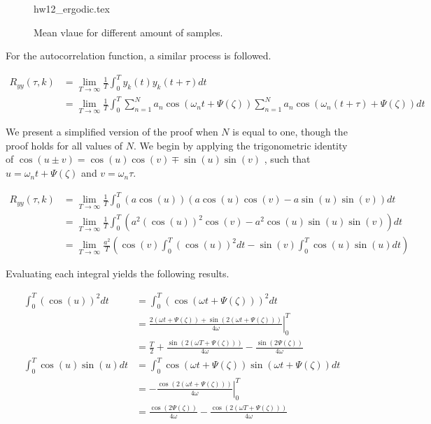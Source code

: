 \documentclass[a4paper,12pt]{article}
\begin{document}
\begin{enumerate}
\begin{figure}[htb!]
\centering
{hw12_ergodic.tex}
\caption{Mean vlaue for different amount of samples.}
\label{fig: ergodic}
\end{figure}

 For the autocorrelation function, a similar process is followed.

 \begin{align*}
  R_{yy} (\tau, k) & = \lim _{T \rightarrow \infty} \frac{1}{T} \int_0^T y_k (t) y_k (t + \tau) dt\\
  &= \lim _{T \rightarrow \infty} \frac{1}{T} \int_0^T \sum_{n=1}^N a_n \cos(\omega_n t + \Psi (\zeta))
  \sum_{n=1}^N a_n \cos(\omega_n (t+ \tau) + \Psi (\zeta))
  dt
 \end{align*}

We present a simplified version of the proof when $N$ is equal to one, though the proof holds for all values of $N$.
We begin by applying the trigonometric identity of $\cos(u\pm v) = \cos(u)\cos(v) \mp \sin(u) \sin(v)$ , such that $u = \omega_n t + \Psi(\zeta)$ and $v = \omega_n \tau$.

 \begin{align*}
  R_{yy} (\tau, k) &= \lim _{T \rightarrow \infty} \frac{1}{T} \int_0^T  (a \cos(u))(a\cos(u)\cos(v) - a\sin(u)\sin(v)) dt\\
  &= \lim _{T \rightarrow \infty} \frac{1}{T} \int_0^T  (a^2 (\cos (u))^2 \cos(v) - a^2 \cos(u)\sin(u)\sin(v)) dt\\
  &= \lim _{T \rightarrow \infty} \frac{a^2}{T} ( \cos(v)\int_0^T (\cos(u))^2 dt -  \sin(v) \int_0^T \cos(u) \sin(u) dt )
 \end{align*}

 Evaluating each integral yields the following results.

 \begin{align*}
\int_0^T (\cos(u))^2 dt &= \int_0^T (\cos(\omega t + \Psi(\zeta)))^2 dt \\
&= \left. \frac{2 (\omega t + \Psi(\zeta)) + \sin (2(\omega t + \Psi(\zeta)))}{4 \omega}  \right\rvert_{0}^{T}\\
&= \frac{T}{2} + \frac{\sin(2(\omega T + \Psi(\zeta)))}{4\omega} - \frac{\sin(2\Psi(\zeta))}{4\omega} \\
%
\int_0^T \cos(u) \sin(u) dt &= \int_0^T \cos(\omega t + \Psi(\zeta)) \sin(\omega t + \Psi(\zeta)) dt\\
&= \left .  - \frac{\cos (2 (\omega t + \Psi(\zeta)))}{4 \omega} \right\rvert_{0}^{T}\\
&= \frac{\cos(2\Psi (\zeta))}{4\omega} - \frac{\cos (2 (\omega T + \Psi(\zeta)))}{4 \omega}
 \end{align*}


\end{enumerate}
\end{document}
